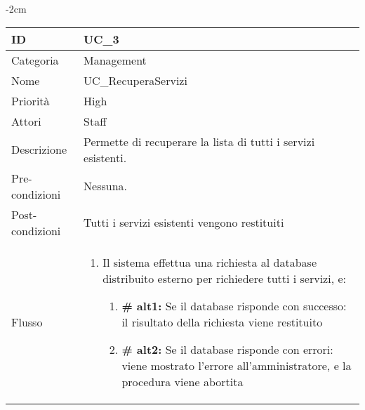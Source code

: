 \begin{center}
\begin{table}[bp]
    \centering
    \addtolength{\leftskip} {-2cm}
\begin{tabular}{ |p{2.6cm}|p{13cm}|  }
\hline
ID & UC\_3 \\\hline
Categoria & Management\\\hline
Nome & UC\_RecuperaServizi\\\hline
Priorità & High \\\hline
Attori &  Staff \\\hline
Descrizione & Permette di recuperare la lista di tutti i servizi esistenti.\\\hline
Pre-condizioni &  Nessuna.\\\hline
Post-condizioni &  Tutti i servizi esistenti vengono restituiti\\\hline
Flusso &  	\vspace{-5mm} \begin{enumerate}
			\item Il sistema effettua una richiesta al database distribuito esterno per richiedere tutti i servizi, e:
				\begin{enumerate}[label*=\arabic*.]
				\item \textbf{\# alt1:} Se il database risponde con successo: il risultato della richiesta viene restituito
				\item \textbf{\# alt2:} Se il database risponde con errori: viene mostrato l'errore all'amministratore, e la procedura viene abortita
				\end{enumerate}
		\end{enumerate}\\\hline
\end{tabular}
\label{table_use_case:3}\newline
\end{table}


\end{center}
